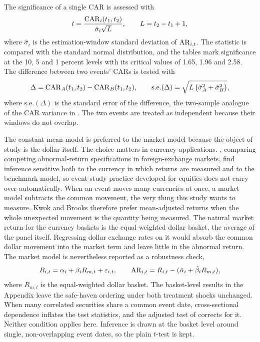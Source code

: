 The significance of a single CAR is assessed with
\begin{equation}
  \label{eq:car_tstat}
  t = \frac{\mathrm{CAR}_i(t_1,t_2)}{\hat\sigma_i \sqrt{L}},
  \qquad L = t_2 - t_1 + 1,
\end{equation}
where $\hat\sigma_i$ is the estimation-window standard deviation of $\mathrm{AR}_{i,t}$. The statistic is compared with the standard normal distribution, and the tables mark significance at the 10, 5 and 1 percent levels with its critical values of 1.65, 1.96 and 2.58. The difference between two events' CARs is tested with
\begin{equation}
  \label{eq:cross_event_difference}
  \Delta = \mathrm{CAR}_A(t_1,t_2) - \mathrm{CAR}_B(t_1,t_2), \qquad
  \mathrm{s.e.}(\Delta) = \sqrt{L\,\bigl(\hat\sigma_A^2 + \hat\sigma_B^2\bigr)},
\end{equation}
where $\mathrm{s.e.}(\Delta)$ is the standard error of the difference, the two-sample analogue of the CAR variance in \textcite{campbell_lo_mackinlay_1997}. The two events are treated as independent because their windows do not overlap.

The constant-mean model is preferred to the market model because the object of study is the dollar itself. The choice matters in currency applications. \textcite{kwok_brooks_1990}, comparing competing abnormal-return specifications in foreign-exchange markets, find inference sensitive both to the currency in which returns are measured and to the benchmark model, so event-study practice developed for equities does not carry over automatically. When an event moves many currencies at once, a market model subtracts the common movement, the very thing this study wants to measure. Kwok and Brooks therefore prefer mean-adjusted returns when the whole unexpected movement is the quantity being measured. The natural market return for the currency baskets is the equal-weighted dollar basket, the average of the panel itself. Regressing dollar exchange rates on it would absorb the common dollar movement into the market term and leave little in the abnormal return. The market model is nevertheless reported as a robustness check,
\begin{equation}
  \label{eq:market_model}
  R_{i,t} = \alpha_i + \beta_i R_{m,t} + \varepsilon_{i,t}, \qquad
  \mathrm{AR}_{i,t} = R_{i,t} - (\hat\alpha_i + \hat\beta_i R_{m,t}),
\end{equation}
where $R_{m,t}$ is the equal-weighted dollar basket. The basket-level results in the Appendix leave the safe-haven ordering under both treatment shocks unchanged. When many correlated securities share a common event date, cross-sectional dependence inflates the test statistics, and the adjusted test of \textcite{kolari_pynnonen_2010} corrects for it. Neither condition applies here. Inference is drawn at the basket level around single, non-overlapping event dates, so the plain $t$-test is kept.

